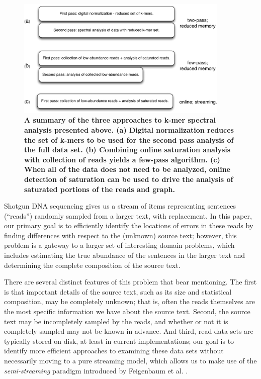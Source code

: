 \documentclass{article}
\begin{document}
\begin{figure}[!ht]
 \centerline{\includegraphics[width=4in]{./figures/summary-algorithms}}
\caption{\bf A summary of the three approaches to k-mer spectral analysis
  presented above.  (a) Digital normalization reduces the set of k-mers
  to be used for the second pass analysis of the full data set. (b) Combining
  online saturation analysis with collection of reads yields a few-pass
  algorithm.  (c) When all of the data does not need to be analyzed, online
  detection of saturation can be used to drive the analysis of saturated
  portions of the reads and graph.}
\label{fig:summary}
\end{figure}

\label{sec:alg}

Shotgun DNA sequencing gives us a stream
of items representing sentences (``reads'') randomly sampled from a
larger text, with replacement.  In this paper, our primary goal is to
efficiently identify the locations of errors in these reads by
finding differences with respect to the (unknown) source text; however, this
problem is a gateway to a larger set of interesting domain problems,
which includes estimating the true abundance of the sentences in the
larger text and determining the complete composition of the source text.

There are several distinct features of this problem that bear
mentioning.  The first is that important details of the source text,
such as its size and statistical composition, may be completely
unknown; that is, often the reads themselves are the most specific
information we have about the source text.  Second, the source text
may be incompletely sampled by the reads, and whether or not it is
completely sampled may not be known in advance.  And third, read
data sets are typically stored on disk, at least in current
implementations; our goal is to identify more efficient approaches to
examining these data sets without necessarily moving to a pure
streaming model, which allows us to make use of the {\em
  semi-streaming} paradigm introduced by Feigenbaum et
al. \cite{Feigenbaum2005}.
\end{document}
